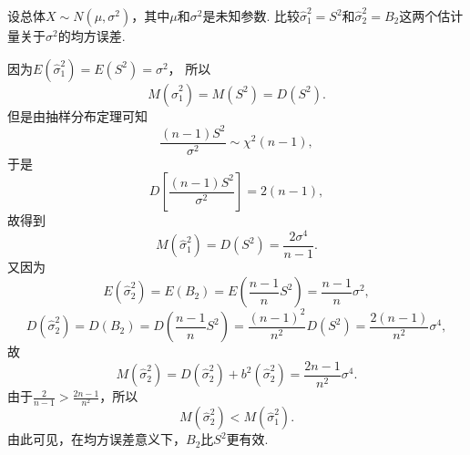 \begin{example}
设总体\(X \sim N(\mu,\sigma^2)\)，其中\(\mu\)和\(\sigma^2\)是未知参数.
比较\(\hat\sigma_1^2=S^2\)和\(\hat\sigma_2^2=B_2\)这两个估计量关于\(\sigma^2\)的均方误差.
\begin{solution}
因为\(E(\hat{\sigma}_1^2)
= E(S^2)
= \sigma^2\)，
所以\begin{equation*}
	M(\hat{\sigma}_1^2)
	= M(S^2)
	= D(S^2).
\end{equation*}
但是由抽样分布定理可知\begin{equation*}
	\frac{(n-1) S^2}{\sigma^2}
	\sim
	\chi^2(n-1),
\end{equation*}
于是\begin{equation*}
	D\left[\frac{(n-1) S^2}{\sigma^2}\right]
	= 2(n-1),
\end{equation*}
故得到\begin{equation*}
	M(\hat{\sigma}_1^2)
	= D(S^2)
	= \frac{2\sigma^4}{n-1}.
\end{equation*}
又因为\begin{equation*}
	E(\hat{\sigma}_2^2)
	= E(B_2)
	= E\left(\frac{n-1}{n} S^2\right)
	= \frac{n-1}{n} \sigma^2,
\end{equation*}\begin{equation*}
	D(\hat{\sigma}_2^2)
	= D(B_2)
	= D\left(\frac{n-1}{n} S^2\right)
	= \frac{(n-1)^2}{n^2} D(S^2)
	= \frac{2(n-1)}{n^2} \sigma^4,
\end{equation*}
故\begin{equation*}
	M(\hat{\sigma}_2^2)
	= D(\hat{\sigma}_2^2) + b^2(\hat{\sigma}_2^2)
	= \frac{2n-1}{n^2} \sigma^4.
\end{equation*}
由于\(\frac{2}{n-1} > \frac{2n-1}{n^2}\)，所以\begin{equation*}
	M(\hat{\sigma}_2^2) < M(\hat{\sigma}_1^2).
\end{equation*}
由此可见，在均方误差意义下，\(B_2\)比\(S^2\)更有效.
\end{solution}
\end{example}

